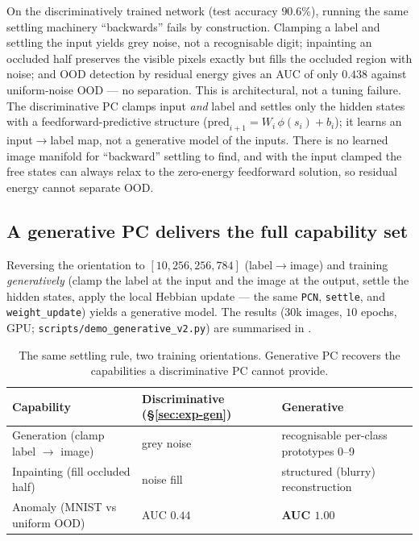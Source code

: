 On the discriminatively trained network (test accuracy \(90.6\%\)), running the same settling
machinery ``backwards'' fails by construction. Clamping a label and settling the input yields grey
noise, not a recognisable digit; inpainting an occluded half preserves the visible pixels exactly
but fills the occluded region with noise; and OOD detection by residual energy gives an AUC of only
\(0.438\) against uniform-noise OOD --- no separation. This is architectural, not a tuning failure.
The discriminative PC clamps input \emph{and} label and settles only the hidden states with a
feedforward-predictive structure (\(\text{pred}_{i+1}=W_i\,\phi(s_i)+b_i\)); it learns an
input\(\rightarrow\)label map, not a generative model of the inputs. There is no learned image
manifold for ``backward'' settling to find, and with the input clamped the free states can always
relax to the zero-energy feedforward solution, so residual energy cannot separate OOD.

\subsection{A generative PC delivers the full capability set}

Reversing the orientation to \([10,256,256,784]\) (label\(\rightarrow\)image) and training
\emph{generatively} (clamp the label at the input and the image at the output, settle the hidden
states, apply the local Hebbian update --- the same \texttt{PCN}, \texttt{settle}, and
\texttt{weight\_update}) yields a generative model. The results (\(30\)k images, \(10\) epochs,
GPU; \texttt{scripts/demo\_generative\_v2.py}) are summarised in .

\begin{table}[t]
  \centering
  \caption{The same settling rule, two training orientations. Generative PC recovers the
  capabilities a discriminative PC cannot provide.}
  \label{tab:generative}
  \begin{tabular}{lll}
    \toprule
    Capability & Discriminative (§\ref{sec:exp-gen}) & \textbf{Generative} \\
    \midrule
    Generation (clamp label \(\rightarrow\) image) & grey noise & recognisable per-class prototypes 0--9 \\
    Inpainting (fill occluded half)                & noise fill & structured (blurry) reconstruction \\
    Anomaly (MNIST vs uniform OOD)                 & AUC \(0.44\) & \textbf{AUC \(1.00\)} \\
    \bottomrule
  \end{tabular}
\end{table}

